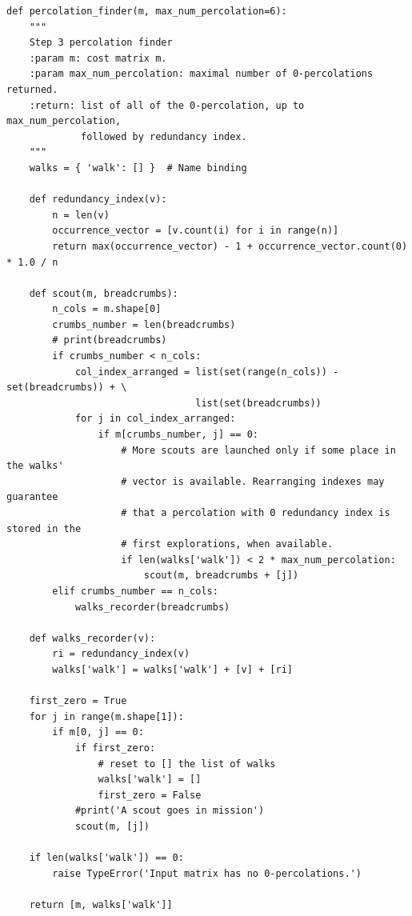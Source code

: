 \documentclass[12pt]{ClasseMatematicamente}
\begin{document}
\begin{small}
\begin{lstlisting}
def percolation_finder(m, max_num_percolation=6):
	"""
	Step 3 percolation finder
	:param m: cost matrix m.
	:param max_num_percolation: maximal number of 0-percolations returned.
	:return: list of all of the 0-percolation, up to max_num_percolation, 
	         followed by redundancy index.
	"""
	walks = { 'walk': [] }  # Name binding
	
	def redundancy_index(v):
		n = len(v)
		occurrence_vector = [v.count(i) for i in range(n)]
		return max(occurrence_vector) - 1 + occurrence_vector.count(0) * 1.0 / n
	
	def scout(m, breadcrumbs):
		n_cols = m.shape[0]
		crumbs_number = len(breadcrumbs)
		# print(breadcrumbs)
		if crumbs_number < n_cols:
			col_index_arranged = list(set(range(n_cols)) - set(breadcrumbs)) + \
			                     list(set(breadcrumbs))
			for j in col_index_arranged:
				if m[crumbs_number, j] == 0:
					# More scouts are launched only if some place in the walks' 
					# vector is available. Rearranging indexes may guarantee 
					# that a percolation with 0 redundancy index is stored in the
					# first explorations, when available.
					if len(walks['walk']) < 2 * max_num_percolation:
						scout(m, breadcrumbs + [j])
		elif crumbs_number == n_cols:
			walks_recorder(breadcrumbs)
	
	def walks_recorder(v):
		ri = redundancy_index(v)
		walks['walk'] = walks['walk'] + [v] + [ri]
		
	first_zero = True
	for j in range(m.shape[1]):
		if m[0, j] == 0:
			if first_zero:
				# reset to [] the list of walks
				walks['walk'] = []
				first_zero = False
			#print('A scout goes in mission')
			scout(m, [j])
	
	if len(walks['walk']) == 0:
		raise TypeError('Input matrix has no 0-percolations.')
	
	return [m, walks['walk']]
\end{lstlisting}
\end{small}
\end{document}
